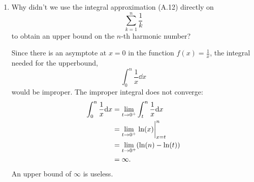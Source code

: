 \documentclass[AppendixA]{subfiles}
\begin{document}
\begin{enumerate}
		\item Why didn't we use the integral approximation (A.12) directly on
		\[
			\sum_{k = 1}^n \frac{1}{k}
		\]
		to obtain an upper bound on the $n$-th harmonic number?
		\begin{answer}
			Since there is an asymptote at $x = 0$ in the function $f(x) = \frac{1}{x}$, the integral needed for the upperbound,
			\[
				\int_0^n \frac{1}{x} \dd x
			\]
			would be improper. The improper integral does not converge:
			\begin{align*}
				\int_0^n \frac{1}{x} \dd x &= \lim_{t \to 0^+} \int_t^n \frac{1}{x} \dd x\\
					&= \lim_{t \to 0^+} \eval{\ln(x)}_{x = t}^n\\
					&= \lim_{t \to 0^+} (\ln(n) - \ln(t))\\
					&= \infty.
			\end{align*}
			An upper bound of $\infty$ is useless.
		\end{answer}
		
	\end{enumerate}
\end{document}
